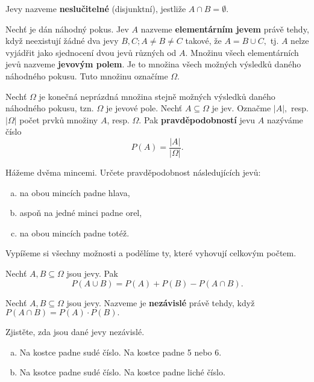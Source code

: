 \begin{definition}
    Jevy nazveme \textbf{neslučitelné} (disjunktní), jestliže $A\cap B = \emptyset.$
\end{definition}

\begin{definition}
    Nechť je dán náhodný pokus. Jev $A$ nazveme \textbf{elementárním jevem} právě tehdy,
    když neexistují žádné dva jevy $B,C; A\ne B\ne C$ takové, že $A=B\cup C,$ tj.
    $A$ nelze vyjádřit jako sjednocení dvou jevů různých od $A.$ Množinu všech
    elementárních jevů nazveme \textbf{jevovým polem}. Je to množina všech možných
    výsledků daného náhodného pokusu. Tuto množinu označíme $\Omega.$
\end{definition}

\begin{definition}
    Nechť $\Omega$ je konečná neprázdná množina stejně možných výsledků daného
    náhodného pokusu, tzn. $\Omega$ je jevové pole. Nechť $A\subseteq \Omega$ je jev.
    Označme $|A|,$ resp. $|\Omega|$ počet prvků množiny $A$, resp. $\Omega.$ Pak
    \textbf{pravděpodobností} jevu $A$ nazýváme číslo
    $$P(A)=\frac{|A|}{|\Omega|}.$$
\end{definition}

\begin{priklad}
Hážeme dvěma mincemi. Určete pravděpodobnost následujících jevů:
\begin{enumerate}[a.]
\item na obou mincích padne hlava,
\item aspoň na jedné minci padne orel,
\item na obou mincích padne totéž.
\end{enumerate}
\end{priklad}

\begin{reseni}
Vypíšeme si všechny možnosti a podělíme ty, které vyhovují celkovým počtem.
\end{reseni}

\begin{veta}
    Nechť $A,B\subseteq \Omega$ jsou jevy. Pak
    $$P(A\cup B)=P(A)+P(B)-P(A\cap B).$$
\end{veta}

\begin{definition}
    Nechť $A,B\subseteq \Omega$ jsou jevy. Nazveme je \textbf{nezávislé} právě tehdy,
    když $P(A\cap B)=P(A)\cdot P(B).$
\end{definition}

\begin{priklad}
Zjistěte, zda jsou dané jevy nezávislé.
\begin{enumerate}[a.]
\item Na kostce padne sudé číslo. Na kostce padne 5 nebo 6.
\item Na ksotce padne sudé číslo. Na kostce padne liché číslo.
\end{enumerate}
\end{priklad}

